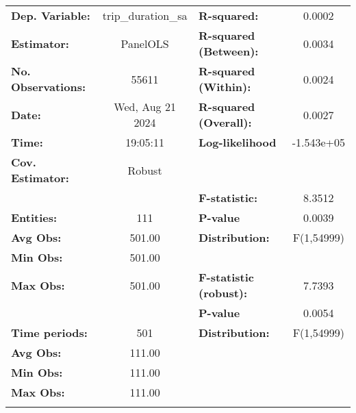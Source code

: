 \begin{center}
\begin{tabular}{lclc}
\toprule
\textbf{Dep. Variable:}    & trip\_duration\_sa & \textbf{  R-squared:         }   &      0.0002      \\
\textbf{Estimator:}        &      PanelOLS      & \textbf{  R-squared (Between):}  &      0.0034      \\
\textbf{No. Observations:} &       55611        & \textbf{  R-squared (Within):}   &      0.0024      \\
\textbf{Date:}             &  Wed, Aug 21 2024  & \textbf{  R-squared (Overall):}  &      0.0027      \\
\textbf{Time:}             &      19:05:11      & \textbf{  Log-likelihood     }   &    -1.543e+05    \\
\textbf{Cov. Estimator:}   &       Robust       & \textbf{                     }   &                  \\
\textbf{}                  &                    & \textbf{  F-statistic:       }   &      8.3512      \\
\textbf{Entities:}         &        111         & \textbf{  P-value            }   &      0.0039      \\
\textbf{Avg Obs:}          &       501.00       & \textbf{  Distribution:      }   &    F(1,54999)    \\
\textbf{Min Obs:}          &       501.00       & \textbf{                     }   &                  \\
\textbf{Max Obs:}          &       501.00       & \textbf{  F-statistic (robust):} &      7.7393      \\
\textbf{}                  &                    & \textbf{  P-value            }   &      0.0054      \\
\textbf{Time periods:}     &        501         & \textbf{  Distribution:      }   &    F(1,54999)    \\
\textbf{Avg Obs:}          &       111.00       & \textbf{                     }   &                  \\
\textbf{Min Obs:}          &       111.00       & \textbf{                     }   &                  \\
\textbf{Max Obs:}          &       111.00       & \textbf{                     }   &                  \\
\textbf{}                  &                    & \textbf{                     }   &                  \\
\bottomrule

\end{tabular}
\end{center}
